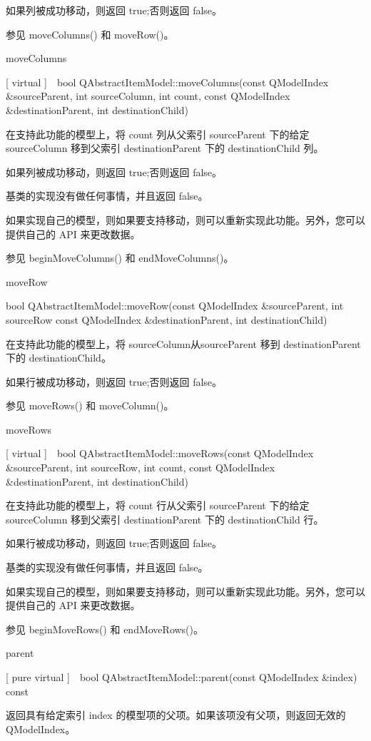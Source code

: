 如果列被成功移动，则返回 true;否则返回 false。

参见 moveColumns() 和 moveRow()。

moveColumns

[ virtual ] bool QAbstractItemModel::moveColumns(const QModelIndex \&sourceParent, int sourceColumn, int count, const QModelIndex \&destinationParent, int destinationChild)

在支持此功能的模型上，将 count 列从父索引 sourceParent 下的给定 sourceColumn 移到父索引 destinationParent 下的 destinationChild 列。

如果列被成功移动，则返回 true;否则返回 false。

基类的实现没有做任何事情，并且返回 false。

如果实现自己的模型，则如果要支持移动，则可以重新实现此功能。另外，您可以提供自己的 API 来更改数据。

参见 beginMoveColumns() 和 endMoveColumns()。

moveRow

bool QAbstractItemModel::moveRow(const QModelIndex \&sourceParent, int sourceRow const QModelIndex \&destinationParent, int destinationChild)

在支持此功能的模型上，将 sourceColumn从sourceParent 移到 destinationParent 下的 destinationChild。

如果行被成功移动，则返回 true;否则返回 false。

参见 moveRows() 和 moveColumn()。

moveRows

[ virtual ] bool QAbstractItemModel::moveRows(const QModelIndex \&sourceParent, int sourceRow, int count, const QModelIndex \&destinationParent, int destinationChild)

在支持此功能的模型上，将 count 行从父索引 sourceParent 下的给定 sourceColumn 移到父索引 destinationParent 下的 destinationChild 行。

如果行被成功移动，则返回 true;否则返回 false。

基类的实现没有做任何事情，并且返回 false。

如果实现自己的模型，则如果要支持移动，则可以重新实现此功能。另外，您可以提供自己的 API 来更改数据。

参见 beginMoveRows() 和 endMoveRows()。

parent

[ pure virtual ] bool QAbstractItemModel::parent(const QModelIndex \&index) const

返回具有给定索引 index 的模型项的父项。如果该项没有父项，则返回无效的 QModelIndex。

